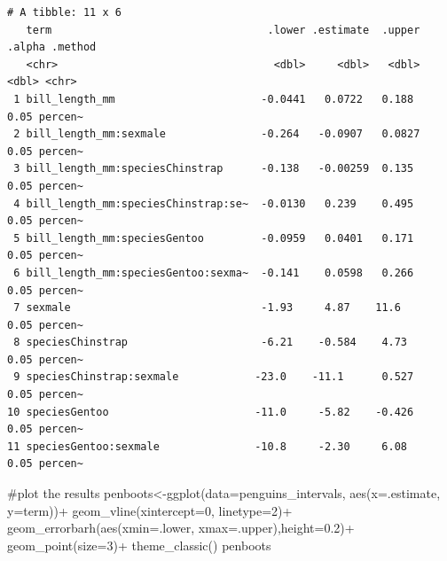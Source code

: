 \documentclass[
  letterpaper,
  DIV=11,
  numbers=noendperiod]{scrartcl}
\newenvironment{Shaded}{\begin{snugshade}}{\end{snugshade}}
\newcommand{\AttributeTok}[1]{\textcolor[rgb]{0.40,0.45,0.13}{#1}}
\newcommand{\CommentTok}[1]{\textcolor[rgb]{0.37,0.37,0.37}{#1}}
\newcommand{\DecValTok}[1]{\textcolor[rgb]{0.68,0.00,0.00}{#1}}
\newcommand{\FloatTok}[1]{\textcolor[rgb]{0.68,0.00,0.00}{#1}}
\newcommand{\FunctionTok}[1]{\textcolor[rgb]{0.28,0.35,0.67}{#1}}
\newcommand{\NormalTok}[1]{\textcolor[rgb]{0.00,0.23,0.31}{#1}}
\newcommand{\OtherTok}[1]{\textcolor[rgb]{0.00,0.23,0.31}{#1}}
\newcommand{\SpecialCharTok}[1]{\textcolor[rgb]{0.37,0.37,0.37}{#1}}
\begin{document}
\begin{verbatim}
# A tibble: 11 x 6
   term                                  .lower .estimate  .upper .alpha .method
   <chr>                                  <dbl>     <dbl>   <dbl>  <dbl> <chr>  
 1 bill_length_mm                       -0.0441   0.0722   0.188    0.05 percen~
 2 bill_length_mm:sexmale               -0.264   -0.0907   0.0827   0.05 percen~
 3 bill_length_mm:speciesChinstrap      -0.138   -0.00259  0.135    0.05 percen~
 4 bill_length_mm:speciesChinstrap:se~  -0.0130   0.239    0.495    0.05 percen~
 5 bill_length_mm:speciesGentoo         -0.0959   0.0401   0.171    0.05 percen~
 6 bill_length_mm:speciesGentoo:sexma~  -0.141    0.0598   0.266    0.05 percen~
 7 sexmale                              -1.93     4.87    11.6      0.05 percen~
 8 speciesChinstrap                     -6.21    -0.584    4.73     0.05 percen~
 9 speciesChinstrap:sexmale            -23.0    -11.1      0.527    0.05 percen~
10 speciesGentoo                       -11.0     -5.82    -0.426    0.05 percen~
11 speciesGentoo:sexmale               -10.8     -2.30     6.08     0.05 percen~
\end{verbatim}

\begin{Shaded}
\begin{Highlighting}[]
\CommentTok{\#plot the results}
\NormalTok{penboots}\OtherTok{\textless{}{-}}\FunctionTok{ggplot}\NormalTok{(}\AttributeTok{data=}\NormalTok{penguins\_intervals, }\FunctionTok{aes}\NormalTok{(}\AttributeTok{x=}\NormalTok{.estimate, }\AttributeTok{y=}\NormalTok{term))}\SpecialCharTok{+}
  \FunctionTok{geom\_vline}\NormalTok{(}\AttributeTok{xintercept=}\DecValTok{0}\NormalTok{, }\AttributeTok{linetype=}\DecValTok{2}\NormalTok{)}\SpecialCharTok{+}
  \FunctionTok{geom\_errorbarh}\NormalTok{(}\FunctionTok{aes}\NormalTok{(}\AttributeTok{xmin=}\NormalTok{.lower, }\AttributeTok{xmax=}\NormalTok{.upper),}\AttributeTok{height=}\FloatTok{0.2}\NormalTok{)}\SpecialCharTok{+}
  \FunctionTok{geom\_point}\NormalTok{(}\AttributeTok{size=}\DecValTok{3}\NormalTok{)}\SpecialCharTok{+}
  \FunctionTok{theme\_classic}\NormalTok{()}
\NormalTok{penboots}
\end{Highlighting}
\end{Shaded}
\end{document}
